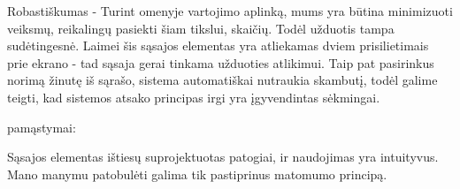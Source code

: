 ﻿\documentclass[a4paper, 12pt]{article}
\begin{document}
		Robastiškumas - Turint omenyje vartojimo aplinką, mums yra būtina minimizuoti veiksmų, reikalingų pasiekti šiam tikslui, skaičių.
		Todėl užduotis tampa sudėtingesnė.
		Laimei šis sąsajos elementas yra atliekamas dviem prisilietimais prie ekrano - tad sąsaja gerai tinkama užduoties atlikimui.
		Taip pat pasirinkus norimą žinutę iš sąrašo, sistema automatiškai nutraukia skambutį, todėl galime teigti, kad sistemos atsako principas irgi yra įgyvendintas sėkmingai.

		pamąstymai:

		Sąsajos elementas ištiesų suprojektuotas patogiai, ir naudojimas yra intuityvus.
		Mano manymu patobulėti galima tik pastiprinus matomumo principą. 
\end{document}
